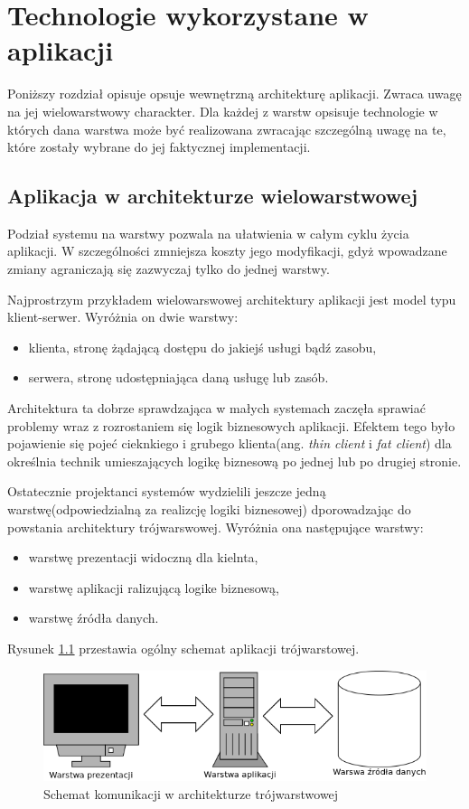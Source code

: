 \chapter{Technologie wykorzystane w aplikacji}
Poniższy rozdział opisuje opsuje wewnętrzną architekturę aplikacji. Zwraca uwagę na jej wielowarstwowy charackter. Dla każdej z warstw opsisuje technologie w których dana warstwa może być realizowana zwracając szczególną uwagę na te, które zostały wybrane do jej faktycznej implementacji.

\section[Aplikacja w architekturze wielowarstwowej][Aplikacja w architekturze wielowarstwowej]{Aplikacja w architekturze wielowarstwowej}
Podział systemu na warstwy pozwala na ułatwienia w całym cyklu życia aplikacji. W szczególności zmniejsza koszty jego modyfikacji, gdyż wpowadzane zmiany agraniczają się zazwyczaj tylko do jednej warstwy. 

Najprostrzym przykładem wielowarswowej architektury aplikacji jest model typu klient-serwer. Wyróżnia on dwie warstwy:
\begin{itemize}
	\item klienta, stronę żądającą dostępu do jakiejś usługi bądź zasobu,
	\item serwera, stronę udostępniająca daną usługę lub zasób.
\end{itemize}
Architektura ta dobrze sprawdzająca w małych systemach zaczęła sprawiać problemy wraz z rozrostaniem się logik biznesowych aplikacji. Efektem tego było pojawienie się pojeć cieknkiego i grubego klienta(ang. \textit{thin client} i \textit{fat client}) dla określnia technik umieszających logikę biznesową po jednej lub po drugiej stronie.

Ostatecznie projektanci systemów wydzielili jeszcze jedną warstwę(odpowiedzialną za realizcję logiki biznesowej) dporowadzając do powstania architektury trójwarswowej. Wyróżnia ona następujące warstwy:
\begin{itemize}
	\item warstwę prezentacji widoczną dla kielnta,
	\item warstwę aplikacji ralizującą logike biznesową,
	\item warstwę źródła danych.
\end{itemize}
Rysunek \ref{warstwy} przestawia ogólny schemat aplikacji trójwarstowej.

\begin{figure}[tdh]
    \begin{center}
	\includegraphics[scale=.7 ]{img/warstwy.png}
	\caption{Schemat komunikacji w architekturze trójwarstwowej}
	\label{warstwy}
    \end{center}
\end{figure}


